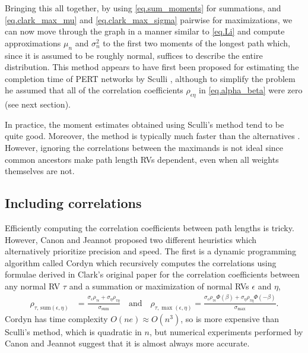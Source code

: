 \documentclass[12pt]{article}
\begin{document}
Bringing this all together, by using \eqref{eq.sum_moments} for summations, and \eqref{eq.clark_max_mu} and \eqref{eq.clark_max_sigma} pairwise for maximizations, we can now move through the graph in a manner similar to \eqref{eq.Li} and compute approximations $\mu_n$ and $\sigma_n^2$ to the first two moments of the longest path which, since it is assumed to be roughly normal, suffices to describe the entire distribution. This method appears to have first been proposed for estimating the completion time of PERT networks by Sculli \cite{scu83}, although to simplify the problem he assumed that all of the correlation coefficients $\rho_{\epsilon \eta}$ in \eqref{eq.alpha_beta} were zero (see next section).

In practice, the moment estimates obtained using Sculli's method tend to be quite good. Moreover, the method is typically much faster than the alternatives \cite{can16}. However, ignoring the correlations between the maximands is not ideal since common ancestors make path length RVs dependent, even when all weights themselves are not. 

\subsection{Including correlations}
\label{subsect.correlation_aware}

Efficiently computing the correlation coefficients between path lengths is tricky. However, Canon and Jeannot \cite{can16} proposed two different heuristics which alternatively prioritize precision and speed. The first is a dynamic programming algorithm called Cordyn which recursively computes the correlations using formulae derived in Clark's original paper for the correlation coefficients between any normal RV $\tau$ and a summation or maximization of normal RVs $\epsilon$ and $\eta$, 
\begin{align}
  \label{eq.clark_corrs}
  \rho_{\tau, \, \text{sum}(\epsilon, \eta)} &= \frac{\sigma_\epsilon \rho_{\tau \epsilon} + \sigma_\eta \rho_{\tau \eta} }{\sigma_{\text{sum}}} \quad \text{and} \quad
\rho_{\tau, \max(\epsilon, \eta)} = \frac{\sigma_\epsilon \rho_{\tau \epsilon} \Phi(\beta) + \sigma_\eta \rho_{\tau \eta} \Phi(-\beta)}{\sigma_{\max}}.
\end{align} 
Cordyn has time complexity $O(ne) \approx O(n^3)$, so is more expensive than Sculli's method, which is quadratic in $n$, but numerical experiments performed by Canon and Jeannot suggest that it is almost always more accurate. 
\end{document}
